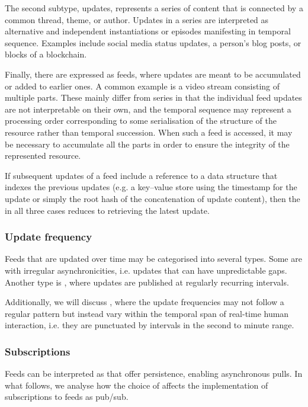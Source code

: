 The second subtype,  updates, represents a series of content that is connected by a common thread, theme, or author. Updates in a series are interpreted as alternative and independent instantiations or episodes manifesting in temporal sequence. Examples include social media status updates, a person's blog posts, or blocks of a blockchain.

Finally, there are  expressed as feeds, where updates are meant to be accumulated or added to earlier ones. A common example is a video stream consisting of multiple parts. These mainly differ from series in that the individual feed updates are not interpretable on their own, and the temporal sequence may represent a processing order corresponding to some serialisation of the structure of the resource rather than temporal succession. When such a feed is accessed, it may be necessary to accumulate all the parts in order to ensure the integrity of the represented resource.

If subsequent updates of a feed include a reference to a data structure that indexes the previous updates (e.g. a key--value store using the timestamp for the update or simply the root hash of the concatenation of update content), then the  in all three cases reduces to retrieving the latest update.

\subsubsection{Update frequency}

Feeds that are updated over time may be categorised into several types. Some are  with irregular asynchronicities, i.e. updates that can have unpredictable gaps. Another type is , where updates are published at regularly recurring intervals.

Additionally, we will discuss , where the update frequencies may not follow a regular pattern but instead vary within the temporal span of real-time human interaction, i.e. they are punctuated by intervals in the second to minute range.

\subsubsection{Subscriptions}

Feeds can be interpreted as  that offer persistence, enabling asynchronous pulls. In what follows, we analyse how the choice of  affects the implementation of subscriptions to feeds as pub/sub.

